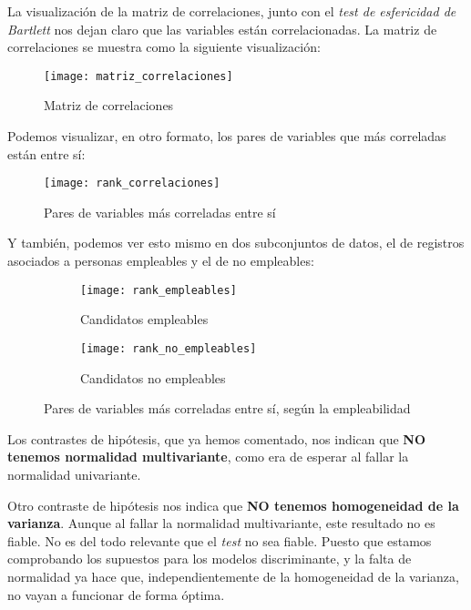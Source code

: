 La visualización de la matriz de correlaciones, junto con el \textit{test de esfericidad de Bartlett} nos dejan claro que las variables están correlacionadas. La matriz de correlaciones se muestra como la siguiente visualización:

\begin{figure}[H]
    \centering
    \texttt{[image: matriz\_correlaciones]}
    \caption{Matriz de correlaciones}
\end{figure}

Podemos visualizar, en otro formato, los pares de variables que más correladas están entre sí:

\begin{figure}[H]
    \centering
    \texttt{[image: rank\_correlaciones]}
    \caption{Pares de variables más correladas entre sí}
\end{figure}

Y también, podemos ver esto mismo en dos subconjuntos de datos, el de registros asociados a personas empleables y el de no empleables:

\begin{figure}[H]
    \centering
    \begin{subfigure}{0.45\textwidth}
        \texttt{[image: rank\_empleables]}
        \caption{Candidatos empleables}
    \end{subfigure}
    \begin{subfigure}{0.45\textwidth}
        \texttt{[image: rank\_no\_empleables]}
        \caption{Candidatos no empleables}
    \end{subfigure}

    \caption{Pares de variables más correladas entre sí, según la empleabilidad}
\end{figure}

Los contrastes de hipótesis, que ya hemos comentado, nos indican que \textbf{NO tenemos normalidad multivariante}, como era de esperar al fallar la normalidad univariante.

Otro contraste de hipótesis nos indica que \textbf{NO tenemos homogeneidad de la varianza}. Aunque al fallar la normalidad multivariante, este resultado no es fiable. No es del todo relevante que el \textit{test} no sea fiable. Puesto que estamos comprobando los supuestos para los modelos discriminante, y la falta de normalidad ya hace que, independientemente de la homogeneidad de la varianza, no vayan a funcionar de forma óptima.


